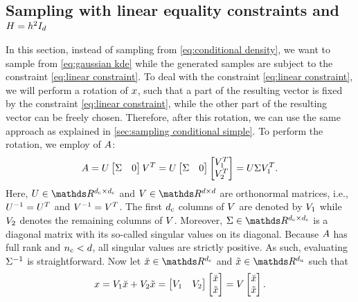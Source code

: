 \subsection{Sampling with linear equality constraints and $H=h^2I_{d}$}
\label{sec:sampling constrained simple}

In this section, instead of sampling from \cref{eq:conditional density}, we want to sample from \cref{eq:gaussian kde} while the generated samples are subject to the constraint \cref{eq:linear constraint}.
To deal with the constraint \cref{eq:linear constraint}, we will perform a rotation of $x$, such that a part of the resulting vector is fixed by the constraint \cref{eq:linear constraint}, while the other part of the resulting vector can be freely chosen.
Therefore, after this rotation, we can use the same approach as explained in \cref{sec:sampling conditional simple}.
To perform the rotation, we employ  \autocite{golub2013matrix} of $A$:
\begin{equation}
	\label{eq:svd constraint matrix}
	A 
	= U \begin{bmatrix} \Sigma & 0 \end{bmatrix} V^T
	= U
	\begin{bmatrix} \Sigma & 0 \end{bmatrix}
	\begin{bmatrix} V_1^T \\ V_2^T \end{bmatrix}
	= U \Sigma V_1^T.
\end{equation}
Here, $\svdu \in \realnumbers^{\dimensionparta \times \dimensionparta}$ and $\svdv \in \realnumbers^{\dimension \times \dimension}$ are orthonormal matrices, i.e., $U^{-1} = U^T$ and $V^{-1} = V^T$.
The first $d_\mathrm{c}$ columns of $V$ are denoted by $V_1$ while $V_2$ denotes the remaining columns of $V$.
Moreover, $\svds \in \realnumbers^{\dimensionparta \times \dimensionparta}$ is a diagonal matrix with its so-called singular values on its diagonal.
Because $A$ has full rank and $n_\mathrm{c}<d$, all singular values are strictly positive.
As such, evaluating $\Sigma^{-1}$ is straightforward.
Now let $\variableconstrained \in \realnumbers^{\dimensionparta}$ and $\variableunconstrained \in \realnumbers^{\dimensionpartb}$ such that
\begin{equation}
	\label{eq:rotation variable}
	x = V_1 \breve{x} + V_2 \tilde{x} 
	= \begin{bmatrix} V_1 & V_2 \end{bmatrix} \begin{bmatrix} \breve{x} \\ \tilde{x} \end{bmatrix}
	= V \begin{bmatrix} \breve{x} \\ \tilde{x} \end{bmatrix}.
\end{equation}
